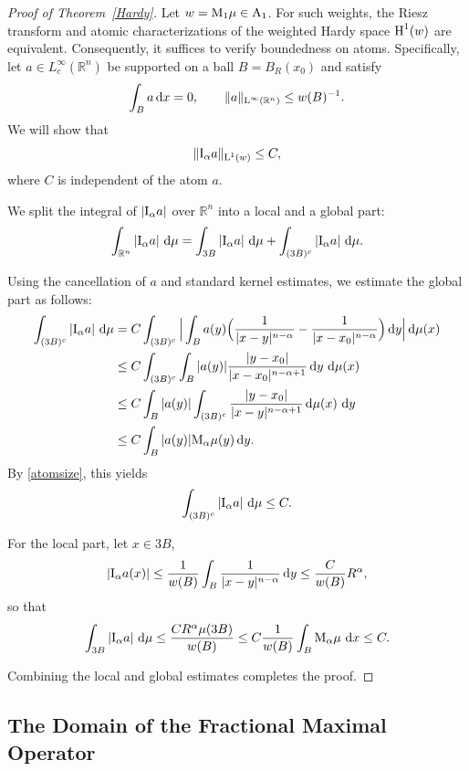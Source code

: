 \documentclass[11pt, a4paper, reqno]{amsart}
\newcommand{\R}{\mathbb R}
\newcommand{\A}{\textup A}
\newcommand{\al}{\alpha}
\newcommand{\dx}{\,{\mathrm dx}}
\newcommand{\dmu}{\,{\mathrm d\mu}}
\newcommand{\dy}{\,{\mathrm dy}}
\newcommand{\Lup}{\textup{L}}
\theoremstyle{definition}
\theoremstyle{remark}
\begin{document}
\begin{proof}[Proof of Theorem~\ref{Hardy}]
Let $w = \textup{M}_1 \mu \in \A_1$.  For such weights, the Riesz transform and atomic characterizations of the weighted Hardy space \(\textup{H}^1(w)\) are equivalent. Consequently, it suffices to verify boundedness on atoms.  Specifically, let \(a \in L^\infty_c(\R^n)\) be supported on a ball \(B = B_R(x_0)\) and satisfy
\begin{equation}\label{atomsize}
\int_B a \,\mathrm{d}x = 0, \qquad \|a\|_{\Lup^\infty(\R^n)} \le w(B)^{-1}.
\end{equation}
We will show that
\[
\|\textup{I}_\alpha a\|_{\Lup^1(w)} \le C,
\]
where \(C\) is independent of the atom \(a\).  

We split the integral of $|\textup I_\al a|$ over $\R^n$ into a local and a global part:
\[
\int_{\R^n} |\textup I_\al a| \,\dmu = \int_{3B} |\textup I_\al a| \,\dmu + \int_{(3B)^c} |\textup I_\al a| \,\dmu.
\]

\medskip
Using the cancellation of $a$ and standard kernel estimates, we estimate the global part as follows:
\begin{align*}
\int_{(3B)^c} |\textup I_\al a| \,\dmu
&= C \int_{(3B)^c} \Big|\int_B a(y) \Big(\frac{1}{|x-y|^{n-\al}} - \frac{1}{|x-x_0|^{n-\al}}\Big) \dy \Big| \dmu(x) \\
&\le C \int_{(3B)^c} \int_B |a(y)| \frac{|y-x_0|}{|x-x_0|^{n-\al+1}} \dy \, \dmu(x) \\
&\le C \int_B |a(y)| \int_{(3B)^c} \frac{|y-x_0|}{|x-y|^{n-\al+1}} \dmu(x) \, \dy \\
&\le C \int_B |a(y)| \textup{M}_\al \mu(y) \dy.
\end{align*}
By \eqref{atomsize}, this yields
\[
\int_{(3B)^c} |\textup I_\al a| \,\dmu \le C.
\]

\medskip
For the local part, let $x\in 3B$,
\[
|\textup I_\al a(x)| \le \frac{1}{w(B)} \int_B \frac{1}{|x-y|^{n-\al}} \dy \le \frac{C}{w(B)} R^\al,
\]
so that
\[
\int_{3B} |\textup I_\al a| \,\dmu \le \frac{C R^\al \mu(3B)}{w(B)} \le C \frac{1}{w(B)} \int_B \textup M_\al \mu \, \dx \le C.
\]

Combining the local and global estimates completes the proof.
\end{proof}




\subsection{The Domain of the Fractional Maximal Operator}
\end{document}
